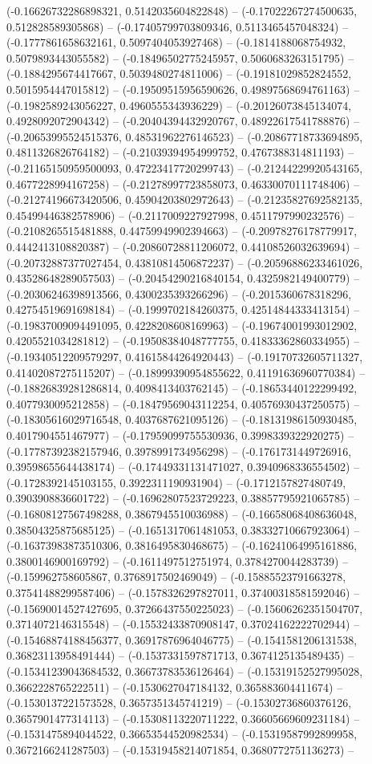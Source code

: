 (-0.16626732286898321, 0.5142035604822848) -- (-0.17022267274500635, 0.512828589305868) -- (-0.17405799703809346, 0.5113465457048324) -- (-0.1777861658632161, 0.5097404053927468) -- (-0.1814188068754932, 0.5079893443055582) -- (-0.18496502775245957, 0.5060683263151795) -- (-0.1884295674417667, 0.5039480274811006) -- (-0.19181029852824552, 0.5015954447015812) -- (-0.19509515956590626, 0.49897568694761163) -- (-0.1982589243056227, 0.4960555343936229) -- (-0.20126073845134074, 0.4928092072904342) -- (-0.20404394432920767, 0.48922617541788876) -- (-0.20653995524515376, 0.48531962276146523) -- (-0.20867718733694895, 0.4811326826764182) -- (-0.21039394954999752, 0.4767388314811193) -- (-0.21165150959500093, 0.47223417720299743) -- (-0.21244229920543165, 0.4677228994167258) -- (-0.21278997723858073, 0.46330070111748406) -- (-0.21274196673420506, 0.45904203802972643) -- (-0.21235827692582135, 0.45499446382578906) -- (-0.2117009227927998, 0.4511797990232576) -- (-0.2108265515481888, 0.44759949902394663) -- (-0.20978276178779917, 0.4442413108820387) -- (-0.20860728811206072, 0.44108526032639694) -- (-0.20732887377027454, 0.43810814506872237) -- (-0.20596886233461026, 0.43528648289057503) -- (-0.20454290216840154, 0.4325982149400779) -- (-0.20306246398913566, 0.4300235393266296) -- (-0.2015360678318296, 0.42754519691698184) -- (-0.1999702184260375, 0.42514844333413154) -- (-0.19837009094491095, 0.4228208608169963) -- (-0.19674001993012902, 0.4205521034281812) -- (-0.19508384048777755, 0.41833362860334955) -- (-0.19340512209579297, 0.41615844264920443) -- (-0.19170732605711327, 0.41402087275115207) -- (-0.18999390954855622, 0.41191636960770384) -- (-0.18826839281286814, 0.4098413403762145) -- (-0.18653440122299492, 0.4077930095212858) -- (-0.18479569043112254, 0.40576930437250575) -- (-0.18305616029716548, 0.4037687621095126) -- (-0.18131986150930485, 0.4017904551467977) -- (-0.17959099755530936, 0.3998339322920275) -- (-0.17787392382157946, 0.3978991734956298) -- (-0.1761731449726916, 0.39598655644438174) -- (-0.17449331131471027, 0.3940968336554502) -- (-0.1728392145103155, 0.3922311190931904) -- (-0.1712157827480749, 0.3903908836601722) -- (-0.16962807523729223, 0.38857795921065785) -- (-0.16808127567498288, 0.3867945510036988) -- (-0.16658068408636048, 0.38504325875685125) -- (-0.1651317061481053, 0.38332710667923064) -- (-0.16373983873510306, 0.3816495830468675) -- (-0.16241064995161886, 0.3800146900169792) -- (-0.1611497512751974, 0.3784270044283739) -- (-0.159962758605867, 0.3768917502469049) -- (-0.15885523791663278, 0.37541488299587406) -- (-0.1578326297827011, 0.37400318581592046) -- (-0.15690014527427695, 0.37266437550225023) -- (-0.15606262351504707, 0.3714072146315548) -- (-0.15532433870908147, 0.37024162222702944) -- (-0.15468874188456377, 0.36917876964046775) -- (-0.1541581206131538, 0.36823113958491444) -- (-0.1537331597871713, 0.3674125135489435) -- (-0.15341239043684532, 0.36673783536126464) -- (-0.15319152527995028, 0.3662228765222511) -- (-0.1530627047184132, 0.365883604411674) -- (-0.1530137221573528, 0.3657351345741219) -- (-0.15302736860376126, 0.3657901477314113) -- (-0.15308113220711222, 0.36605669609231184) -- (-0.1531475894044522, 0.36653544520982534) -- (-0.15319587992899958, 0.3672166241287503) -- (-0.15319458214071854, 0.3680772751136273) -- 